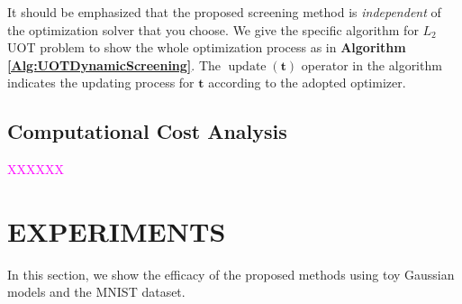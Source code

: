 \documentclass[twoside]{article}
\theoremstyle{plain}
\renewcommand{\vec}[1]{\bm{#1}}
\newcommand{\note}[1]{\textcolor{magenta}{#1}}
\begin{document}
It should be emphasized that the proposed screening method is {\it independent} of the optimization solver that you choose. We give the specific algorithm for $L_2$ UOT problem to show the whole optimization process as in {\bf Algorithm \ref{Alg:UOTDynamicScreening}}. The $\operatorname{update}(\vec{t})$ operator in the algorithm indicates the updating process for $\vec{t}$ according to the adopted optimizer.\\

\subsection{Computational Cost Analysis}
\note{XXXXXX}

\section{EXPERIMENTS}
\label{sec:exp}
In this section, we show the efficacy of the proposed methods using toy Gaussian models and the MNIST dataset.
\end{document}
